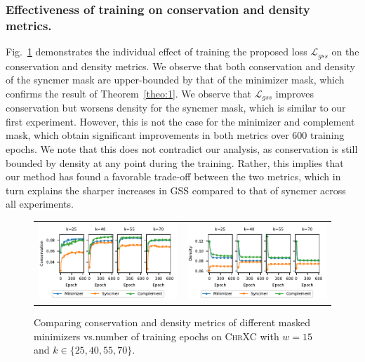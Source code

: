 \subsubsection{Effectiveness of training on conservation and density metrics.} Fig.~\ref{fig:5} demonstrates the individual effect of training the proposed loss $\mathcal{L}_{gss}$ on the conservation and density metrics. We observe that both conservation and density of the syncmer mask are upper-bounded by that of the minimizer mask, which confirms the result of  Theorem~\ref{theo:1}. We observe that $\mathcal{L}_{gss}$ improves conservation but worsens density for the syncmer mask, which is similar to our first experiment. However, this is not the case for the minimizer and complement mask, which obtain significant improvements in both metrics over $600$ training epochs. We note that this does not contradict our analysis, as conservation is still bounded by density at any point during the training. Rather, this implies that our method has found a favorable trade-off between the two metrics, which in turn explains the sharper increases in GSS compared to that of syncmer across all experiments.

\begin{figure}[ht]
\centering
\begin{tabular}{cc}
\includegraphics[scale=1]{masked_mnz_plots/fig5/compare_con_vs_epoch_chrXC.pdf} & 
\includegraphics[scale=1]{masked_mnz_plots/fig5/compare_den_vs_epoch_chrXC.pdf} \end{tabular}  
\caption{Comparing conservation and density metrics of different masked minimizers vs.\@ number of training epochs on \textsc{ChrXC} with $w=15$ and $k\in\{25,40,55,70\}$.}
\label{fig:5}
\end{figure}

